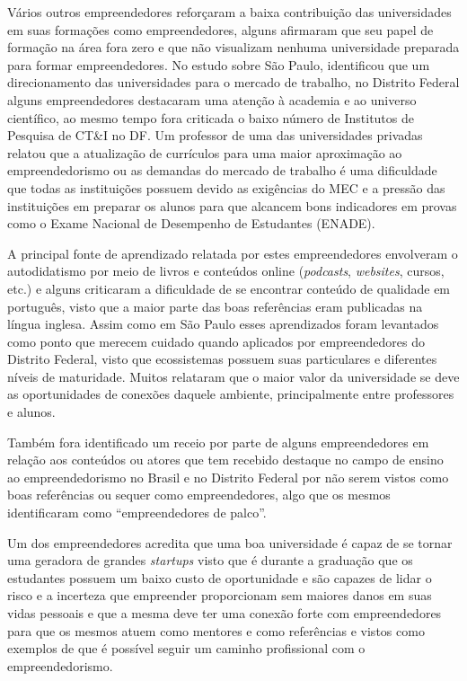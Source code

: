 Vários outros empreendedores reforçaram a baixa contribuição das universidades em suas formações como empreendedores, alguns afirmaram que seu papel de formação na área fora zero e que não visualizam nenhuma universidade preparada para formar empreendedores. No estudo sobre São Paulo,  identificou que um direcionamento das universidades para o mercado de trabalho, no Distrito Federal alguns empreendedores destacaram uma atenção à academia e ao universo científico, ao mesmo tempo fora criticada o baixo número de Institutos de Pesquisa de CT\&I no DF. Um professor de uma das universidades privadas relatou que a atualização de currículos para uma maior aproximação ao empreendedorismo ou as demandas do mercado de trabalho é uma dificuldade que todas as instituições possuem devido as exigências do MEC e a pressão das instituições em preparar os alunos para que alcancem bons indicadores em provas como o Exame Nacional de Desempenho de Estudantes (ENADE). 

A principal fonte de aprendizado relatada por estes empreendedores envolveram o autodidatismo por meio de livros e conteúdos online (\textit{podcasts}, \textit{websites}, cursos, etc.) e alguns criticaram a dificuldade de se encontrar conteúdo de qualidade em português, visto que a maior parte das boas referências eram publicadas na língua inglesa. Assim como em São Paulo esses aprendizados foram levantados como ponto que merecem cuidado quando aplicados por empreendedores do Distrito Federal, visto que ecossistemas possuem suas particulares e diferentes níveis de maturidade. Muitos relataram que o maior valor da universidade se deve as oportunidades de conexões daquele ambiente, principalmente entre professores e alunos.

Também fora identificado um receio por parte de alguns empreendedores em relação aos conteúdos ou atores que tem recebido destaque no campo de ensino ao empreendedorismo no Brasil e no Distrito Federal por não serem vistos como boas referências ou sequer como empreendedores, algo que os mesmos identificaram como ``empreendedores de palco''.

Um dos empreendedores acredita que uma boa universidade é capaz de se tornar uma geradora de grandes \textit{startups} visto que é durante a graduação que os estudantes possuem um baixo custo de oportunidade e são capazes de lidar o risco e a incerteza que empreender proporcionam sem maiores danos em suas vidas pessoais e que a mesma deve ter uma conexão forte com empreendedores para que os mesmos atuem como mentores e como referências e vistos como exemplos de que é possível seguir um caminho profissional com o empreendedorismo.

